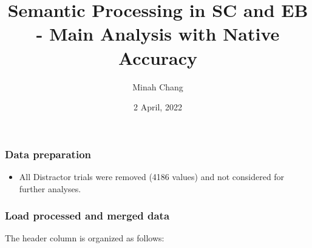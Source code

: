 \documentclass[
]{article}
\title{Semantic Processing in SC and EB - Main Analysis with Native
Accuracy}
\author{Minah Chang}
\date{2 April, 2022}
\providecommand{\tightlist}{%
  \setlength{\itemsep}{0pt}\setlength{\parskip}{0pt}}
\begin{document}
\maketitle

\hypertarget{data-preparation}{%
\subsubsection{Data preparation}\label{data-preparation}}

\begin{itemize}
\tightlist
\item
  All Distractor trials were removed (4186 values) and not considered
  for further analyses.
\end{itemize}

\hypertarget{load-processed-and-merged-data}{%
\subsubsection{Load processed and merged
data}\label{load-processed-and-merged-data}}

The header column is organized as follows:
\end{document}
